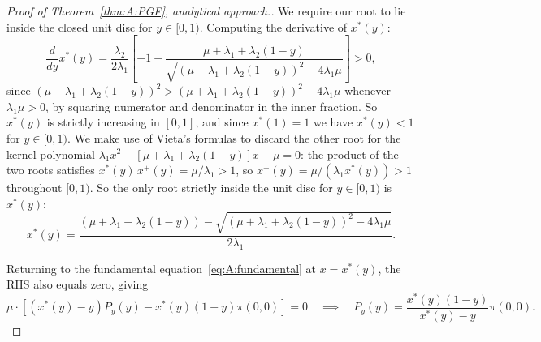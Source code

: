 \begin{proof}[Proof of Theorem~\ref{thm:A:PGF}, analytical approach.]
    We require our root to lie inside the closed unit disc for $y\in[0,1)$. Computing
    the derivative of $x^*(y)$:
    \begin{equation}
        \frac{d}{dy}x^*(y) = \frac{\lambda_2}{2\lambda_1}\!\left[-1+\frac{\mu+\lambda_1+\lambda_2(1-y)}{\sqrt{(\mu+\lambda_1+\lambda_2(1-y))^2-4\lambda_1\mu}}\right]>0,
        \label{eq:A:xstar_prime}
    \end{equation}
    since $(\mu+\lambda_1+\lambda_2(1-y))^2>(\mu+\lambda_1+\lambda_2(1-y))^2-4\lambda_1\mu$
    whenever $\lambda_1\mu>0$, by squaring numerator and denominator in the inner fraction. So $x^*(y)$ is strictly increasing in $[0,1]$, and since $x^*(1)=1$ we have $x^*(y)<1$ for $y\in[0,1)$.
    We make use of Vieta's formulas to discard the other root for the kernel polynomial
    $\lambda_1 x^2-[\mu+\lambda_1+\lambda_2(1-y)]x+\mu=0$: the product of the two
    roots satisfies $x^*(y)\,x^+(y)= \mu/\lambda_1>1$, so
    $x^+(y)=\mu/(\lambda_1 x^*(y))>1$ throughout $[0,1)$. So the only root
    strictly inside the unit disc for $y\in[0,1)$ is $x^*(y)$:
    \begin{equation}
        x^*(y) = \frac{
            (\mu +\lambda_1 + \lambda_2 (1-y))
            - \sqrt{(\mu +\lambda_1 + \lambda_2 (1-y))^2 - 4 \lambda_1 \mu}
        }{
            2\lambda_1
        }.
        \label{eq:A:xstar}
    \end{equation}

    Returning to the fundamental equation~\eqref{eq:A:fundamental} at $x=x^*(y)$,
    the RHS also equals zero, giving
    \begin{equation}
      \mu\cdot\left[(x^*(y)-y)P_y(y) - x^*(y)(1-y)\pi(0,0) \right]=0 \quad \implies \quad  P_y(y) = \frac{x^*(y)(1-y)}{x^*(y) - y} \pi(0,0). \label{eq:A:Py}
    \end{equation}


\end{proof}
